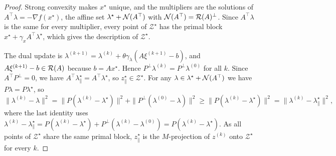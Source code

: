 \documentclass[11pt]{article}
\begin{document}
\begin{proof}
    Strong convexity makes $x^\star$ unique, and the multipliers are the solutions of $A^\top\lambda = -\nabla f(x^\star)$, the affine set $\lambda^\star + {\mathcal N}(A^\top)$ with ${\mathcal N}(A^\top) = {\mathcal R}(A)^\perp$.
    Since $A^\top\lambda$ is the same for every multiplier, every point of $\mathcal{Z}^\star$ has the primal block $x^\star + \gamma_x A^\top\lambda^\star$, which gives the description of $\mathcal{Z}^\star$.

    The dual update is $\lambda^{(k+1)} = \lambda^{(k)} + \theta\gamma_\lambda(A\xi^{(k+1)} - b)$, and $A\xi^{(k+1)} - b \in {\mathcal R}(A)$ because $b = Ax^\star$.
    Hence $P^\perp\lambda^{(k)} = P^\perp\lambda^{(0)}$ for all $k$.
    Since $A^\top P^\perp = 0$, we have $A^\top\lambda^\star_\parallel = A^\top\lambda^\star$, so $z^\star_\parallel \in \mathcal{Z}^\star$.
    For any $\lambda \in \lambda^\star + {\mathcal N}(A^\top)$ we have $P\lambda = P\lambda^\star$, so
    \begin{equation*}
        \|\lambda^{(k)} - \lambda\|^2 = \|P(\lambda^{(k)} - \lambda^\star)\|^2 + \|P^\perp(\lambda^{(0)} - \lambda)\|^2 \geq \|P(\lambda^{(k)} - \lambda^\star)\|^2 = \|\lambda^{(k)} - \lambda^\star_\parallel\|^2,
    \end{equation*}
    where the last identity uses $\lambda^{(k)} - \lambda^\star_\parallel = P(\lambda^{(k)} - \lambda^\star) + P^\perp(\lambda^{(k)} - \lambda^{(0)}) = P(\lambda^{(k)} - \lambda^\star)$.
    As all points of $\mathcal{Z}^\star$ share the same primal block, $z^\star_\parallel$ is the $M$-projection of $z^{(k)}$ onto $\mathcal{Z}^\star$ for every $k$.


\end{proof}
\end{document}
